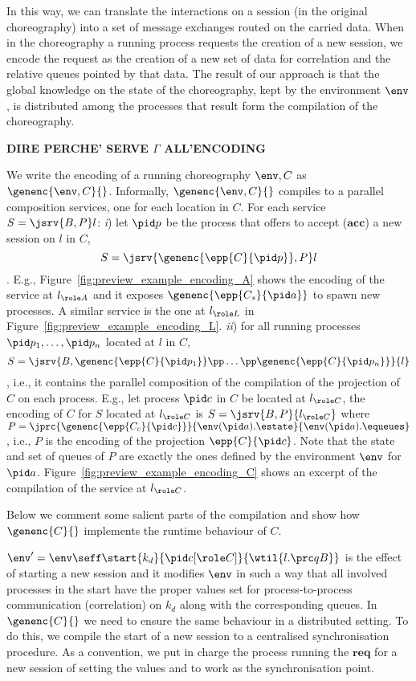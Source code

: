 In this way, we can translate the interactions on a session (in the original
choreography) into a set of message exchanges routed on the carried data. When
in the choreography a running process requests the creation of a new session,
we encode the request as the creation of a new set of data for correlation and
the relative queues pointed by that data. The result of our approach is that
the global knowledge on the state of the choreography, kept by the environment
$\env$, is distributed among the processes that result form the compilation of
the choreography.

\textbf{DIRE PERCHE' SERVE $\Gamma$ ALL'ENCODING} 

We write the encoding of a running choreography $\env,C$ as $\genenc{\env,C}{}$.
Informally, $\genenc{\env,C}{}$ compiles to a parallel composition services, one
for
each location in $C$. For each service $S = \jsrv{B,P}l$:
\emph{i}) let $\pid p$ be the process that offers to accept ($\textbf {acc}$)
a new session on $l$ in $C$, $$S = \jsrv{\genenc{\epp{C}{\pid p}},P}l$$. E.g.,
Figure~\ref{fig:preview_example_encoding_A} shows the encoding of the service
at $l_{\role A}$ and it exposes $\genenc{\epp{C_{s}}{\pid a}}$
to spawn new processes. A similar service is the one at $l_{\role L}$ in
Figure~\ref{fig:preview_example_encoding_L}.
\emph{ii}) for all running processes $\pid p_1, \ldots, \pid p_n$ located at
$l$ in $C$, $$S = \jsrv{B, \genenc{\epp{C}{\pid p_1}} \pp \ldots \pp
\genenc{\epp{C}{\pid p_n}}}{l}$$, i.e., it contains the parallel composition of
the compilation of the projection of $C$ on each process. E.g., let process
$\pid c$ in $C$ be located at $l_{\role C}$, the encoding of $C$ for $S$
located at $l_{\role C}$ is $S = \jsrv{B,P}{l_{\role C}}$ where $P =
\jprc{\genenc{\epp{C_{c}}{\pid c}}} {\env(\pid a).\estate}{\env(\pid
a).\equeues}$, i.e., $P$ is the encoding of the projection $\epp{C}{\pid c}$.
Note that the state and set of queues of $P$ are exactly the ones defined by
the environment $\env$ for $\pid a$.
Figure~\ref{fig:preview_example_encoding_C} shows an excerpt of the compilation
of the service at $l_{\role C}$.


Below we comment some salient parts of the compilation and show how $\genenc{C}
{}$ implements the runtime behaviour of $C$.

$\env' = \env \seff \start {k_d} {\pid c [\role C]} {\wtil {l.\prc qB}}$ is
the effect of starting a new session and it modifies $\env$ in such a way
that all involved processes in the start have the proper values set for
process-to-process communication (correlation) on $k_d$ along with the
corresponding queues. In $\genenc{C}{}$ we need to ensure the same behaviour in
a distributed setting. To do this, we compile the start of a new session to a
centralised synchronisation procedure. As a convention, we put in charge the
process running the $\textbf{req}$ for a new session of setting the values
and to work as the synchronisation point.

